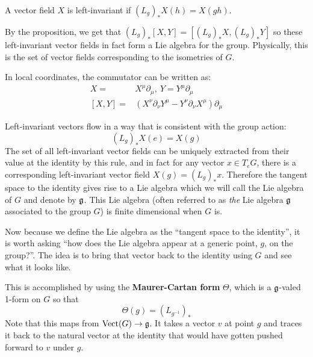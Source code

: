 		A vector field $X$ is left-invariant if $(L_g)_* X(h) = X(gh)$. 
		
		
		By the proposition, we get that $(L_g)_* [X, Y] = [(L_g)_* X, (L_g)_* Y]$ so these left-invariant vector fields in fact form a Lie algebra for the group. Physically, this is the set of vector fields corresponding to the isometries of $G$.
		
		In local coordinates, the commutator can be written as:
		\begin{equation}
			\begin{aligned}
				X = &X^\mu \partial_\mu, ~ Y = Y^\mu \partial_\mu\\
				[X,Y] = &(X^\nu \partial_\nu Y^\mu - Y^\nu \partial_\nu X^\mu) \partial_\mu
			\end{aligned}
		\end{equation}
		
		Left-invariant vectors flow in a way that is consistent with the group action:
		\begin{equation}
			(L_g)_* X(e) = X(g)
		\end{equation}
		The set of all left-invariant vector fields can be uniquely extracted from their value at the identity by this rule, and in fact for any vector $x \in T_e G$, there is a corresponding left-invariant vector field $X(g) = (L_g)_* x$. Therefore the tangent space to the identity gives rise to a Lie algebra which we will call the Lie algebra of $G$ and denote by $\frak g$. This Lie algebra (often referred to as \emph{the} Lie algebra $\frak g$ associated to the group $G$) is finite dimensional when $G$ is.
		
		
		Now because we define the Lie algebra as the ``tangent space to the identity'', it is worth asking ``how does the Lie algebra appear at a generic point, $g$, on the group?''. The idea is to bring that vector back to the identity using $G$ and see what it looks like. 
		
		This is accomplished by using the \textbf{Maurer-Cartan form} $\Theta$, which is a $\frak g$-valed 1-form on $G$ so that 
		\begin{equation}
			\Theta(g) = (L_{g^{-1}})_*
		\end{equation}
		Note that this maps from $\mathrm{Vect}(G) \rightarrow \frak g$. It takes a vector $v$ at point $g$ and traces it back to the natural vector at the identity that would have gotten pushed forward to $v$ under $g$.
		
